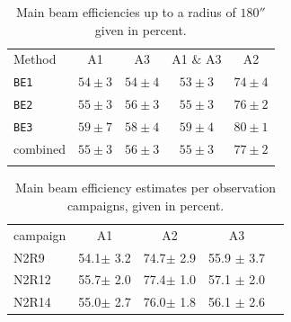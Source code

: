 \begin{table}[!h]
  \caption[]{Main beam efficiencies up to a radius of $180''$ given in percent.}
  \label{tab:beam_efficiency}
  \centering
  \begin{tabular}{l cccc}
    \hline\hline
    \noalign{\smallskip}
    Method & A1 &  A3 & A1 $\&$ A3 &  A2  \\
    \noalign{\smallskip}
    \hline
    \noalign{\smallskip}
    {\tt BE1}  &  $54 \pm 3$  & $54 \pm 4$  &  $53 \pm 3$  &  $74 \pm 4$  \\
    {\tt BE2}  &  $55 \pm 3$  & $56 \pm 3$  &  $55 \pm 3$  &  $76 \pm 2$  \\
    {\tt BE3}  &  $59 \pm 7$  & $58 \pm 4$  &  $59 \pm 4$  &  $80 \pm 1$  \\
    combined          &  $55 \pm 3$  & $56 \pm 3$  &  $55 \pm 3$  &  $77 \pm 2$  \\
    \noalign{\smallskip}
    \hline
  \end{tabular}
\end{table}


\begin{table}[!ht]
\caption{Main beam efficiency estimates per observation campaigns,
given in percent.}
\label{tab:MB}
\centering
\begin{tabular}{lcccc}
\hline\hline
\noalign{\smallskip}
campaign &  A1    &    A2   &  A3    \\
\noalign{\smallskip}
\hline
\noalign{\smallskip}
N2R9    &  54.1$\pm$ 3.2   &  74.7$\pm$ 2.9  & 55.9 $\pm$ 3.7      \\
N2R12   &  55.7$\pm$ 2.0   &  77.4$\pm$ 1.0  & 57.1 $\pm$ 2.0      \\
N2R14   &  55.0$\pm$ 2.7   &  76.0$\pm$ 1.8  & 56.1 $\pm$ 2.6     \\
            \hline
\end{tabular}
\end{table}

